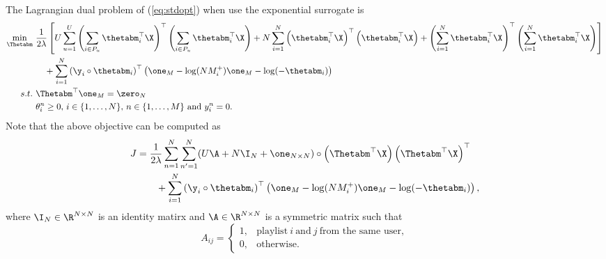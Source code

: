 The Lagrangian dual problem of (\ref{eq:stdopt}) when use the exponential surrogate is
\begin{equation}
\label{eq:dual}
\begin{aligned}
\min_{\Thetabm} \ & \frac{1}{2 \lambda} \left[
     U \sum_{u=1}^U \left( \sum_{i \in P_u} \thetabm_i^\top \X \right)^\top \left( \sum_{i \in P_u} \thetabm_i^\top \X \right)
   + N \sum_{i=1}^N \left( \thetabm_i^\top \X \right)^\top \left( \thetabm_i^\top \X \right)
   + \left( \sum_{i=1}^N \thetabm_i^\top \X \right)^\top \left( \sum_{i=1}^N \thetabm_i^\top \X \right) \right] \\
& \hspace{1em}
   + \sum_{i=1}^N \left( \y_i \circ \thetabm_i \right)^\top \left( \one_M - \log(N M_i^+) \one_M - \log(-\thetabm_i) \right) \\
s.t. \ & \Thetabm^\top \one_M = \zero_N \\
           & \theta_i^n \ge 0, \, i \in \{1,\dots,N\}, \, n \in \{1,\dots,M\} \ \mathrm{and} \ y_i^n = 0.
\end{aligned}
\end{equation}
Note that the above objective can be computed as
\begin{equation*}
\begin{aligned}
J &= \frac{1}{2 \lambda} \sum_{n=1}^N \sum_{n'=1}^N (U \A + N \I_N + \one_{N \times N}) 
     \circ \left( \Thetabm^\top \X \right) \left( \Thetabm^\top \X \right)^\top \\
& \hspace{2em}
     + \sum_{i=1}^N \left( \y_i \circ \thetabm_i \right)^\top \left( \one_M - \log(N M_i^+) \one_M - \log(-\thetabm_i) \right),
\end{aligned}
\end{equation*}
where $\I_N \in \R^{N \times N}$ is an identity matirx and $\A \in \R^{N \times N}$ is a symmetric matrix such that
\begin{equation*}
A_{ij} = 
\begin{cases}
1, & \text{playlist} \ i \ \text{and} \ j \ \text{from the same user}, \\
0, & \text{otherwise}.
\end{cases}
\end{equation*}


